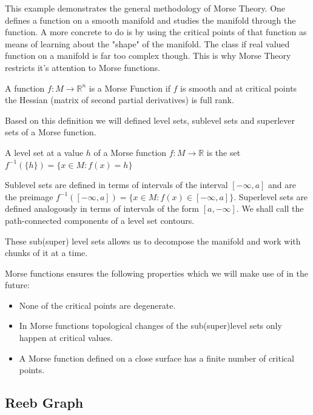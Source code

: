 This example demonstrates the general methodology of Morse Theory. One defines a function on a smooth manifold and studies the manifold through the function. A more concrete to do is by using the critical points of that function as means of learning about the "shape" of the manifold. The class if real valued function on a manifold is far too complex though. This is why Morse Theory restricts it's attention to Morse functions.


\begin{defn} A function $f: M \to \mathbb{R}^n$ is a Morse Function if $f$ is smooth and at critical points the Hessian (matrix of second partial derivatives) is full rank.   \end{defn}

Based on this definition we will defined level sets, sublevel sets and superlever sets of a Morse function.

\begin{defn} A level set at a value $h$ of a Morse function $f: M \to \mathbb{R}$ is the set $f^{-1}(\{h\}) = \{x \in M: f(x) = h \}$   \end{defn}

Sublevel sets are defined in terms of intervals of the interval $[-\infty, a]$ and are the preimage $f^{-1}([-\infty, a]) = \{x \in M: f(x) \in [-\infty, a] \}$. Superlevel sets are defined analogously in terms of intervals of the form $[a, -\infty]$. We shall call the path-connected components of a level set contours.

These sub(super) level sets allows us to decompose the manifold and work with chunks of it at a time.

Morse functions ensures the following properties which we will make use of in the future:

\begin{itemize}
    \item None of the critical points are degenerate.
    \item In Morse functions topological changes of the sub(super)level sets only happen at critical values. 
    \item A Morse function defined on a close surface has a finite number of critical points.
\end{itemize}

\subsection{Reeb Graph}




